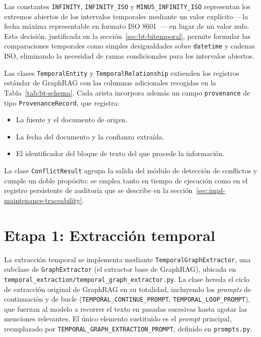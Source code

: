 Las constantes \texttt{INFINITY}, \texttt{INFINITY\_ISO} y \texttt{MINUS\_INFINITY\_ISO} representan los extremos abiertos de los intervalos temporales mediante un valor explícito ---la fecha máxima representable en formato ISO 8601~\cite{TODO_iso8601}--- en lugar de un valor nulo. Esta decisión, justificada en la sección~\ref{sec:bt-bitemporal}, permite formular las comparaciones temporales como simples desigualdades sobre \texttt{datetime} y cadenas ISO, eliminando la necesidad de ramas condicionales para los intervalos abiertos.

Las clases \texttt{TemporalEntity} y \texttt{TemporalRelationship} extienden los registros estándar de GraphRAG con las columnas adicionales recogidas en la Tabla~\ref{tab:bt-schema}. Cada arista incorpora además un campo \texttt{provenance} de tipo \texttt{ProvenanceRecord}, que registra:

\begin{itemize}
  \item La fuente y el documento de origen.
  \item La fecha del documento y la confianza extraída.
  \item El identificador del bloque de texto del que procede la información.
\end{itemize}

La clase \texttt{ConflictResult} agrupa la salida del módulo de detección de conflictos y cumple un doble propósito: se emplea tanto en tiempo de ejecución como en el registro persistente de auditoría que se describe en la sección~\ref{sec:impl-maintenance-traceability}.

\section{Etapa 1: Extracción temporal}\label{sec:impl-stage1}

La extracción temporal se implementa mediante \texttt{TemporalGraphExtractor}, una subclase de \texttt{GraphExtractor} (el extractor base de GraphRAG), ubicada en \texttt{temporal\_extraction/temporal\_graph\_extractor.py}. La clase hereda el ciclo de extracción original de GraphRAG en su totalidad, incluyendo los \emph{prompts} de continuación y de bucle (\texttt{TEMPORAL\_CONTINUE\_PROMPT}, \texttt{TEMPORAL\_LOOP\_PROMPT}), que fuerzan al modelo a recorrer el texto en pasadas sucesivas hasta agotar las menciones relevantes. El único elemento sustituido es el \emph{prompt} principal, reemplazado por \texttt{TEMPORAL\_GRAPH\_EXTRACTION\_PROMPT}, definido en \texttt{prompts.py}.

